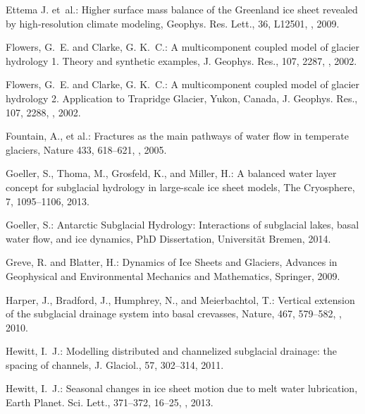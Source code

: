 \documentclass[gmd]{copernicus}   %
\begin{document}
\begin{thebibliography}{}
Ettema J. et~al.: Higher surface mass balance of the Greenland ice sheet
  revealed by high-resolution climate modeling, Geophys. Res. Lett., 36, L12501,
  , 2009.

Flowers, G.~E. and Clarke, G. K.~C.: A multicomponent coupled model of glacier
  hydrology 1. {T}heory and synthetic examples, J. Geophys. Res., 107, 2287,
  , 2002{}.

Flowers, G.~E. and Clarke, G. K.~C.: A multicomponent coupled model of glacier
  hydrology 2. {A}pplication to {T}rapridge {G}lacier, {Y}ukon, {C}anada, J.
  Geophys. Res., 107, 2288, , 2002{}.

Fountain, A., et al.: Fractures as the main pathways of water flow in temperate glaciers, Nature 433, 618--621, , 2005.

Goeller, S., Thoma, M., Grosfeld, K., and Miller, H.: A balanced water layer
  concept for subglacial hydrology in large-scale ice sheet models, The
  Cryosphere, 7, 1095--1106, 2013.

Goeller, S.: Antarctic {S}ubglacial {H}ydrology: {I}nteractions of subglacial lakes, basal water flow, and ice dynamics, PhD Dissertation, Universit\"at Bremen, 2014.

Greve, R. and Blatter, H.: Dynamics of {I}ce {S}heets and {G}laciers, Advances
  in Geophysical and Environmental Mechanics and Mathematics, Springer, 2009.

Harper, J., Bradford, J., Humphrey, N., and Meierbachtol, T.: Vertical
  extension of the subglacial drainage system into basal crevasses, Nature,
  467, 579--582, , 2010.

Hewitt, I.~J.: Modelling distributed and channelized subglacial drainage: the
  spacing of channels, J. Glaciol., 57, 302--314, 2011.

Hewitt, I.~J.: Seasonal changes in ice sheet motion due to melt water
  lubrication, Earth Planet. Sci. Lett., 371--372, 16--25,
  , 2013.


\end{thebibliography}
\end{document}

